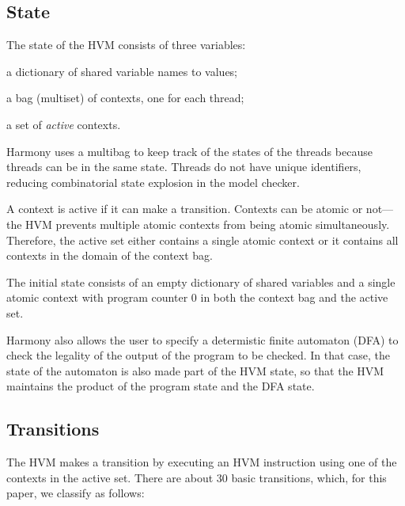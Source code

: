 \documentclass[twocolumn]{article}
\begin{document}
\subsection{State}

The state of the HVM consists of three variables:
\begin{compactitem}
\item a dictionary of shared variable names to values;
\item a bag (multiset) of contexts, one for each thread;
\item a set of \emph{active} contexts.
\end{compactitem}

Harmony uses a multibag to keep track of the states of the threads
because threads can be in the same state.
Threads do not have unique identifiers, reducing combinatorial
state explosion in the model checker.

A context is active if it can make a transition.
Contexts can be atomic or not---the HVM prevents multiple atomic
contexts from being atomic simultaneously.  Therefore, the active set
either contains a single atomic context or it contains all contexts
in the domain of the context bag.

The initial state consists of an empty dictionary of shared variables and
a single atomic context with program
counter 0 in both the context bag and the active set.

Harmony also allows the user to specify a determistic finite automaton
(DFA) to check the legality of the output of the program to be
checked.  In that case, the state of the automaton is also made
part of the HVM state, so that the HVM maintains the product of the
program state and the DFA state.

\subsection{Transitions}

The HVM makes a transition by executing an HVM instruction using
one of the contexts in the active set.  There are about 30 basic
transitions, which, for this paper, we classify as follows:
\end{document}
